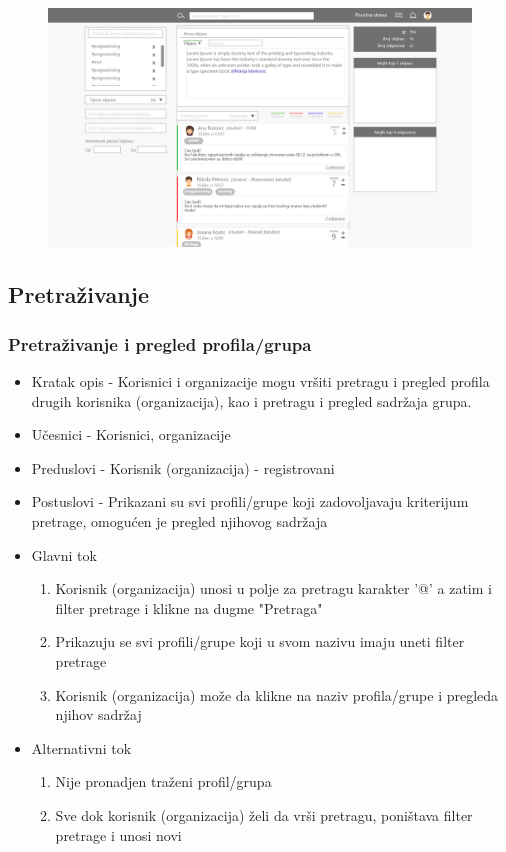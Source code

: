 \begin{figure}[h!]
		\centerline{\includegraphics[width=\textwidth]{slike/deljenje_sadrzaja.png}}
\end{figure}

\subsection{Pretraživanje}
\subsubsection{Pretraživanje i pregled profila/grupa}
\begin{itemize}
	\item Kratak opis - Korisnici i organizacije mogu vršiti pretragu i pregled profila drugih korisnika (organizacija), kao i pretragu i pregled sadržaja grupa.
	\item Učesnici - Korisnici, organizacije
	\item Preduslovi - Korisnik (organizacija) - registrovani
	\item Postuslovi - Prikazani su svi profili/grupe koji zadovoljavaju kriterijum pretrage, omogućen je pregled njihovog sadržaja
	\item Glavni tok
	\begin{enumerate}
		\item Korisnik (organizacija) unosi u polje za pretragu karakter '@' a zatim i filter pretrage i klikne na dugme "Pretraga"
		\item Prikazuju se svi profili/grupe koji u svom nazivu imaju uneti filter pretrage
		\item Korisnik (organizacija) može da klikne na naziv profila/grupe i pregleda njihov sadržaj
	\end{enumerate}
	\item Alternativni tok
	\begin{enumerate}
		\item Nije pronadjen traženi profil/grupa
		\item Sve dok korisnik (organizacija) želi da vrši pretragu, poništava filter pretrage i unosi novi
	\end{enumerate}
\end{itemize}


